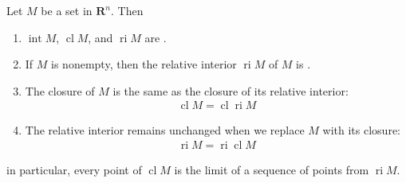 \documentclass{article}
\newcommand{\cl}{\operatorname{cl}}
\newcommand{\ri}{\operatorname{ri}}
\newcommand{\inte}{\operatorname{int}}
\newcommand{\Aff}{\operatorname{Aff}}
\begin{document}
\begin{thma}\label{thm:cox_cl_ri}
Let $M$ be a  set in $\mathbf{R}^{n}$. Then
\begin{enumerate}
    \item $\inte M$, $\cl M$, and $\ri M$ are .
    \item If $M$ is nonempty, then the relative interior  $\ri M$ of $M$ is .
    \item The closure of $M$ is the same as the closure of its relative interior:
\begin{align*}
\cl  M=\cl\ri M
\end{align*}
\item The relative interior remains unchanged when we replace $M$ with its closure:
\begin{align*}
\operatorname{ri} M=\operatorname{ri} \operatorname{cl} M
\end{align*}
\end{enumerate}
\end{thma} 
\begin{rema}
in particular, every point of $\operatorname{cl} M$ is the limit of a sequence of points from  $\ri M$.
\end{rema}
\end{document}
